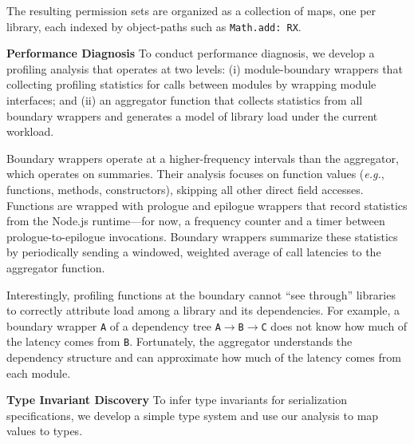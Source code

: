 \documentclass[letterpaper,twocolumn,10pt]{article}
\def\eg{{\em e.g.}, }
\newcommand{\heading}[1]{\vspace{2pt}\noindent\textbf{#1}\enspace}
\newcommand{\ttt}[1]{\texttt{#1}}
\begin{document}
The resulting permission sets are organized as a collection of maps, one per library, each indexed by object-paths such as \ttt{Math.add: RX}.

\heading{Performance Diagnosis}
To conduct performance diagnosis, we develop a profiling analysis that operates at two levels:
 (i) module-boundary wrappers that collecting profiling statistics for calls between modules by wrapping module interfaces; and
 (ii) an aggregator function that collects statistics from all boundary wrappers and generates a model of library load under the current workload.

Boundary wrappers operate at a higher-frequency intervals than the aggregator, which operates on summaries.
Their analysis focuses on function values (\eg functions, methods, constructors), skipping all other direct field accesses.
Functions are wrapped with prologue and epilogue wrappers that record statistics from the Node.js runtime---for now, a frequency counter and a timer between prologue-to-epilogue invocations.
Boundary wrappers summarize these statistics by periodically sending a windowed, weighted average of call latencies to the aggregator function.


Interestingly, profiling functions at the boundary cannot ``see through'' libraries to correctly attribute load among a library and its dependencies.
For example, a boundary wrapper \ttt{A} of a dependency tree \ttt{A}$\rightarrow$\ttt{B}$\rightarrow$\ttt{C} does not know how much of the latency comes from \ttt{B}.
Fortunately, the aggregator understands the dependency structure and can approximate how much of the latency comes from each module.


\heading{Type Invariant Discovery}
To infer type invariants for serialization specifications, we develop a simple type system and use our analysis to map values to types.
\end{document}
